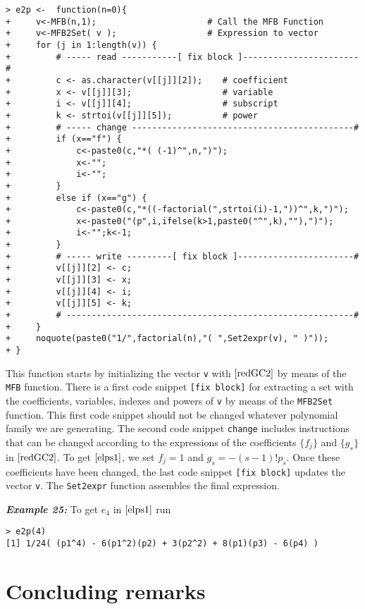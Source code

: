 \begin{verbatim}
> e2p <-  function(n=0){
+     v<-MFB(n,1);                      # Call the MFB Function
+     v<-MFB2Set( v );                  # Expression to vector
+     for (j in 1:length(v)) {
+         # ----- read -----------[ fix block ]-----------------------#
+         c <- as.character(v[[j]][2]);    # coefficient
+         x <- v[[j]][3];                  # variable
+         i <- v[[j]][4];                  # subscript
+         k <- strtoi(v[[j]][5]);          # power
+         # ----- change --------------------------------------------#
+         if (x=="f") {
+             c<-paste0(c,"*( (-1)^",n,")");
+             x<-"";
+             i<-"";
+         }
+         else if (x=="g") {
+             c<-paste0(c,"*((-factorial(",strtoi(i)-1,"))^",k,")");
+             x<-paste0("(p",i,ifelse(k>1,paste0("^",k),""),")");
+             i<-"";k<-1;
+         }
+         # ----- write ---------[ fix block ]-----------------------#
+         v[[j]][2] <- c;
+         v[[j]][3] <- x;
+         v[[j]][4] <- i;
+         v[[j]][5] <- k;
+         # ---------------------------------------------------------#
+     }
+     noquote(paste0("1/",factorial(n),"( ",Set2expr(v), " )"));
+ }
\end{verbatim}

This function starts by initializing the vector \texttt{v} with \(\eqref{redGC2}\) by means of the \texttt{MFB} function. There is a first code snippet \texttt{{[}fix\ block{]}} for extracting a set with the coefficients, variables, indexes and powers of \texttt{v} by means of the \texttt{MFB2Set} function. This first code snippet should not be changed whatever polynomial family we are generating. The second code snippet \texttt{change} includes instructions that can be changed according to the expressions of the coefficients \(\{f_j\}\) and \(\{g_{s}\}\) in \(\eqref{redGC2}\). To get \(\eqref{elps1}\), we set \(f_j=1\) and \(g_{s} = - (s-1)! p_s.\) Once these coefficients have been changed, the last code snippet \texttt{{[}fix\ block{]}} updates the vector \texttt{v}. The \texttt{Set2expr} function assembles the final expression.

\hskip-0.5cm\textbf{\emph{Example 25:}} To get \(e_4\) in \(\eqref{elps1}\) run

\begin{verbatim}
> e2p(4)
[1] 1/24( (p1^4) - 6(p1^2)(p2) + 3(p2^2) + 8(p1)(p3) - 6(p4) )
\end{verbatim}

\hypertarget{concluding-remarks}{%
\section{Concluding remarks}\label{concluding-remarks}}

